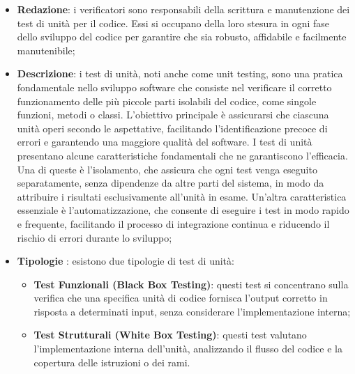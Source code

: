 \begin{itemize}
    \item \textbf{Redazione}: i verificatori sono responsabili della scrittura e manutenzione dei test di unità per il codice. Essi si occupano della loro stesura in ogni fase dello sviluppo del codice per garantire che sia robusto, affidabile e facilmente manutenibile;
    \item \textbf{Descrizione}: i test di unità, noti anche come unit testing, sono una pratica fondamentale nello sviluppo software che consiste nel verificare il corretto funzionamento delle più piccole parti isolabili del codice, come singole funzioni, metodi o classi. L'obiettivo principale è assicurarsi che ciascuna unità operi secondo le aspettative, facilitando l'identificazione precoce di errori e garantendo una maggiore qualità del software. I test di unità presentano alcune caratteristiche fondamentali che ne garantiscono l'efficacia. Una di queste è l'isolamento, che assicura che ogni test venga eseguito separatamente, senza dipendenze da altre parti del sistema, in modo da attribuire i risultati esclusivamente all'unità in esame. Un'altra caratteristica essenziale è l'automatizzazione, che consente di eseguire i test in modo rapido e frequente, facilitando il processo di integrazione continua e riducendo il rischio di errori durante lo sviluppo;
    \item \textbf{Tipologie} : esistono due tipologie di test di unità:
    \begin{itemize}
        \item \textbf{Test Funzionali (Black Box Testing)}: questi test si concentrano sulla verifica che una specifica unità di codice fornisca l'output corretto in risposta a determinati input, senza considerare l'implementazione interna;
        \item \textbf{Test Strutturali (White Box Testing)}: questi test valutano l'implementazione interna dell'unità, analizzando il flusso del codice e la copertura delle istruzioni o dei rami.
    \end{itemize}
\end{itemize}

